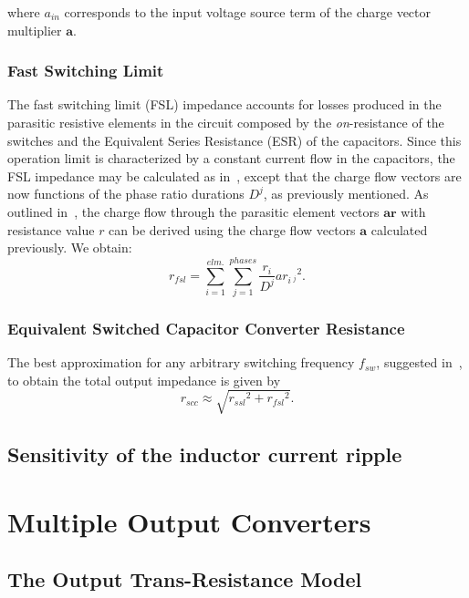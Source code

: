 where $a_{in}$  corresponds to the input voltage source term of the charge
vector multiplier $\mathbf{a}$.

\subsubsection[FSL]{Fast Switching Limit}
The fast switching limit (FSL) impedance accounts for losses produced in the parasitic resistive elements in the circuit composed by the \emph{on}-resistance of the switches and the Equivalent Series Resistance (ESR) of the capacitors. Since this operation limit is characterized by a constant current flow in the capacitors, the FSL impedance may be calculated as in~\cite{Seeman:EECS-2009-78}, except that the charge flow vectors are now functions of the phase ratio durations $D^j$, as previously mentioned. As outlined in~\cite{Seeman:EECS-2009-78}, the charge flow through the parasitic element vectors $\mathbf{ar}$ with resistance value $r$ can be derived using the charge flow vectors $\mathbf{a}$ calculated previously. We obtain:
\begin{equation}
r_{fsl}=\sum_{i=1}^{elm.}\sum_{j=1}^{phases}\frac{r_i}{D^j}{{ar}_{i\ ^j}}^2.
\label{eq:r_ssl}
\end{equation}

\subsubsection{Equivalent Switched Capacitor Converter Resistance}
The best approximation for any arbitrary switching frequency $f_{sw}$, suggested in~\cite{1998Arntzen,1999Maksimovic}, to obtain the total output impedance is given by
\begin{equation}
r_{scc} \approx \sqrt{{r_{ssl}}^2+{r_{fsl}}^2}.
\label{eq:r_scc}
\end{equation}

\subsection{Sensitivity of the inductor current ripple}

\section{Multiple Output Converters}
\subsection{The Output Trans-Resistance Model}
